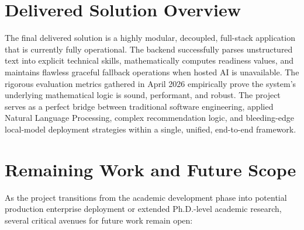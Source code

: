 \documentclass[12pt,a4paper]{report}
\begin{document}
\section{Delivered Solution Overview}

The final delivered solution is a highly modular, decoupled, full-stack application that is currently fully operational. The backend successfully parses unstructured text into explicit technical skills, mathematically computes readiness values, and maintains flawless graceful fallback operations when hosted AI is unavailable. The rigorous evaluation metrics gathered in April 2026 empirically prove the system's underlying mathematical logic is sound, performant, and robust. The project serves as a perfect bridge between traditional software engineering, applied Natural Language Processing, complex recommendation logic, and bleeding-edge local-model deployment strategies within a single, unified, end-to-end framework.

\section{Remaining Work and Future Scope}

As the project transitions from the academic development phase into potential production enterprise deployment or extended Ph.D.-level academic research, several critical avenues for future work remain open:
\end{document}
